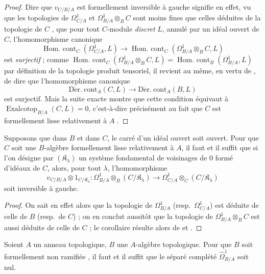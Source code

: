 \begin{proof}
Dire que $v_{C/B/A}$ est formellement inversible à gauche signifie en effet,
vu que les topologies de $\Omega^1_{C/A}$ et $\Omega^1_{B/A}\otimes_B C$
sont moins fines que celles déduites de la topologie de $C$
, que pour tout $C$-module \emph{discret} $L$, annulé par un
idéal ouvert de $C$, l'homomorphisme canonique
\[
  \operatorname{Hom.\ cont}_C(\Omega^1_{C/A},L)\to
  \operatorname{Hom.\ cont}_C(\Omega^1_{B/A}\otimes_B C,L)
\]
est \emph{surjectif}  ; comme
$\operatorname{Hom.\ cont}_C(\Omega^1_{B/A}\otimes_B C,L)=
\operatorname{Hom.\ cont}_B(\Omega^1_{B/A},L)$ par définition de la topologie
produit tensoriel, il revient au même, en vertu de , de dire
que l'homomorphisme canonique
\[
  \operatorname{D\acute{e}r.\ cont}_A(C,L)\to
  \operatorname{D\acute{e}r.\ cont}_A(B,L)
\]
est surjectif. Mais la suite exacte  montre que cette
condition équivaut à $\operatorname{Exalcotop}_{B/A}(C,L)=0$, c'est-à-dire
précisément au fait que $C$ est formellement lisse relativement à $A$
.
\end{proof}

\begin{corollary}[20.7.3]
\label{0.20.7.3-fr}
Supposons que dans $B$ et dans $C$, le carré d'un idéal ouvert soit ouvert.
Pour que $C$ soit une $B$-algèbre formellement lisse relativement à $A$, il
faut et il suffit que si l'on désigne par $(\mathfrak{K}_\lambda)$ un système
fondamental de voisinages de $0$ formé d'idéaux de $C$, alors, pour tout
$\lambda$, l'homomorphisme
\begin{equation}
\tag{20.7.3.1}
\label{0.20.7.3.1-fr}
  v_{C/B/A}\otimes 1_{C/\mathfrak{K}_\lambda}:
  \Omega^1_{B/A}\otimes_B(C/\mathfrak{K}_\lambda)\to
  \Omega^1_{C/A}\otimes_C(C/\mathfrak{K}_\lambda)
\end{equation}
soit inversible à gauche.
\end{corollary}

\begin{proof}
On sait en effet alors que la topologie de $\Omega^1_{B/A}$ (resp.\
$\Omega^1_{C/A}$) est déduite de celle de $B$ (resp.\ de $C$)
 ; on en conclut aussitôt que la topologie de
$\Omega^1_{B/A}\otimes_B C$ est aussi déduite de celle de $C$ ; le corollaire
résulte alors de \sref{0.20.7.2-fr} et \sref{0.19.1.7-fr}.
\end{proof}

\begin{proposition}[20.7.4]
\label{0.20.7.4-fr}
Soient $A$ un anneau topologique, $B$ une $A$-algèbre topologique. Pour que
$B$ soit formellement non ramifiée \textup{\sref{0.19.10.2-fr}}, il faut et il suffit
que le séparé complété $\widehat{\Omega}^1_{B/A}$ soit nul.
\end{proposition}

